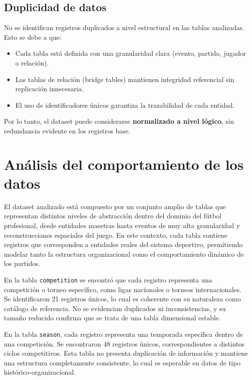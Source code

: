 \documentclass[12pt,a4paper]{article}
\begin{document}
\subsection{Duplicidad de datos}

No se identifican registros duplicados a nivel estructural en las tablas analizadas. Esto se debe a que:

\begin{itemize}
    \item Cada tabla está definida con una granularidad clara (evento, partido, jugador o relación).
    \item Las tablas de relación (bridge tables) mantienen integridad referencial sin replicación innecesaria.
    \item El uso de identificadores únicos garantiza la trazabilidad de cada entidad.
\end{itemize}

Por lo tanto, el dataset puede considerarse \textbf{normalizado a nivel lógico}, sin redundancia evidente en los registros base.

\section{Análisis del comportamiento de los datos}

El dataset analizado está compuesto por un conjunto amplio de tablas que representan distintos niveles de abstracción dentro del dominio del fútbol profesional, desde entidades maestras hasta eventos de muy alta granularidad y reconstrucciones espaciales del juego. En este contexto, cada tabla contiene registros que corresponden a entidades reales del sistema deportivo, permitiendo modelar tanto la estructura organizacional como el comportamiento dinámico de los partidos.

En la tabla \texttt{competition} se encontró que cada registro representa una competición o torneo específico, como ligas nacionales o torneos internacionales. Se identificaron 21 registros únicos, lo cual es coherente con su naturaleza como catálogo de referencia. No se evidencian duplicados ni inconsistencias, y su tamaño reducido confirma que se trata de una tabla dimensional estable.

En la tabla \texttt{season}, cada registro representa una temporada específica dentro de una competición. Se encontraron 48 registros únicos, correspondientes a distintos ciclos competitivos. Esta tabla no presenta duplicación de información y mantiene una estructura completamente consistente, lo cual es esperable en datos de tipo histórico-organizacional.
\end{document}

